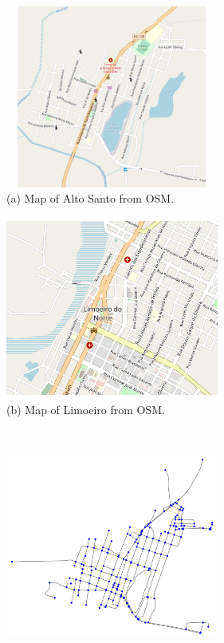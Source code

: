 \documentclass[a4paper,11pt]{article}
\begin{document}
\begin{figure}[!ht]
  \begin{minipage}[c]{.6\textwidth}
    \includegraphics[width=7cm, height=6cm]{alto-santo-osm.png} \\
    (a) Map of Alto Santo from OSM.
  \end{minipage}
  \begin{minipage}[c]{.6\textwidth}
    \includegraphics[width=7cm, height=6cm]{limoeiro-osm.png} \\
    (b) Map of Limoeiro from OSM.
  \end{minipage}
  \\
  \begin{minipage}[c]{.6\textwidth}
    \includegraphics[width=7cm, height=6cm]{graph-alto-santo.png} \\

\end{minipage}
\end{figure}
\end{document}
